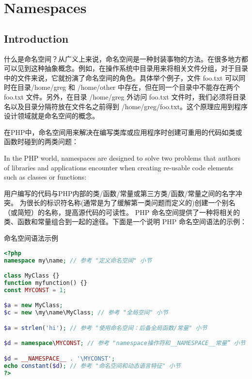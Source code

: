 \part{Namespaces}


\chapter{Introduction}


什么是命名空间？从广义上来说，命名空间是一种封装事物的方法。在很多地方都可以见到这种抽象概念。例如，在操作系统中目录用来将相关文件分组，对于目录中的文件来说，它就扮演了命名空间的角色。具体举个例子，文件 foo.txt 可以同时在目录/home/greg 和 /home/other 中存在，但在同一个目录中不能存在两个 foo.txt 文件。另外，在目录 /home/greg 外访问 foo.txt 文件时，我们必须将目录名以及目录分隔符放在文件名之前得到 /home/greg/foo.txt。这个原理应用到程序设计领域就是命名空间的概念。

在PHP中，命名空间用来解决在编写类库或应用程序时创建可重用的代码如类或函数时碰到的两类问题：

 
 
In the PHP world, namespaces are designed to solve two problems that authors of libraries and applications encounter when creating re-usable code elements such as classes or functions:

用户编写的代码与PHP内部的类/函数/常量或第三方类/函数/常量之间的名字冲突。
为很长的标识符名称(通常是为了缓解第一类问题而定义的)创建一个别名（或简短）的名称，提高源代码的可读性。
PHP 命名空间提供了一种将相关的类、函数和常量组合到一起的途径。下面是一个说明 PHP 命名空间语法的示例：

\begin{example}
命名空间语法示例
\begin{lstlisting}[language=PHP]
<?php
namespace my\name; // 参考 "定义命名空间" 小节

class MyClass {}
function myfunction() {}
const MYCONST = 1;

$a = new MyClass;
$c = new \my\name\MyClass; // 参考 "全局空间" 小节

$a = strlen('hi'); // 参考 "使用命名空间：后备全局函数/常量" 小节

$d = namespace\MYCONST; // 参考 "namespace操作符和__NAMESPACE__常量” 小节

$d = __NAMESPACE__ . '\MYCONST';
echo constant($d); // 参考 "命名空间和动态语言特征" 小节
?>
\end{lstlisting}
\end{example}

